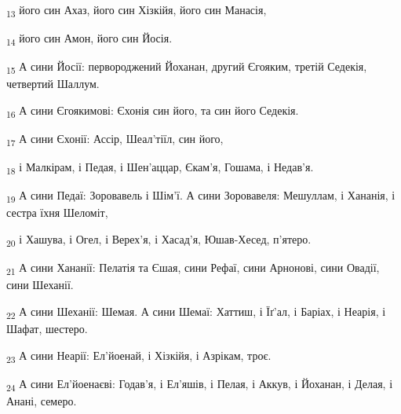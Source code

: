 \begin{tcolorbox}
\textsubscript{13} його син Ахаз, його син Хізкійя, його син Манасія,
\end{tcolorbox}
\begin{tcolorbox}
\textsubscript{14} його син Амон, його син Йосія.
\end{tcolorbox}
\begin{tcolorbox}
\textsubscript{15} А сини Йосії: первороджений Йоханан, другий Єгояким, третій Седекія, четвертий Шаллум.
\end{tcolorbox}
\begin{tcolorbox}
\textsubscript{16} А сини Єгоякимові: Єхонія син його, та син його Седекія.
\end{tcolorbox}
\begin{tcolorbox}
\textsubscript{17} А сини Єхонії: Ассір, Шеал'тіїл, син його,
\end{tcolorbox}
\begin{tcolorbox}
\textsubscript{18} і Малкірам, і Педая, і Шен'аццар, Єкам'я, Гошама, і Недав'я.
\end{tcolorbox}
\begin{tcolorbox}
\textsubscript{19} А сини Педаї: Зоровавель і Шім'ї. А сини Зоровавеля: Мешуллам, і Хананія, і сестра їхня Шеломіт,
\end{tcolorbox}
\begin{tcolorbox}
\textsubscript{20} і Хашува, і Огел, і Верех'я, і Хасад'я, Юшав-Хесед, п'ятеро.
\end{tcolorbox}
\begin{tcolorbox}
\textsubscript{21} А сини Хананії: Пелатія та Єшая, сини Рефаї, сини Арнонові, сини Овадії, сини Шеханії.
\end{tcolorbox}
\begin{tcolorbox}
\textsubscript{22} А сини Шеханії: Шемая. А сини Шемаї: Хаттиш, і Їґ'ал, і Баріах, і Неарія, і Шафат, шестеро.
\end{tcolorbox}
\begin{tcolorbox}
\textsubscript{23} А сини Неарії: Ел'йоенай, і Хізкійя, і Азрікам, троє.
\end{tcolorbox}
\begin{tcolorbox}
\textsubscript{24} А сини Ел'йоенаєві: Годав'я, і Ел'яшів, і Пелая, і Аккув, і Йоханан, і Делая, і Анані, семеро.
\end{tcolorbox}
